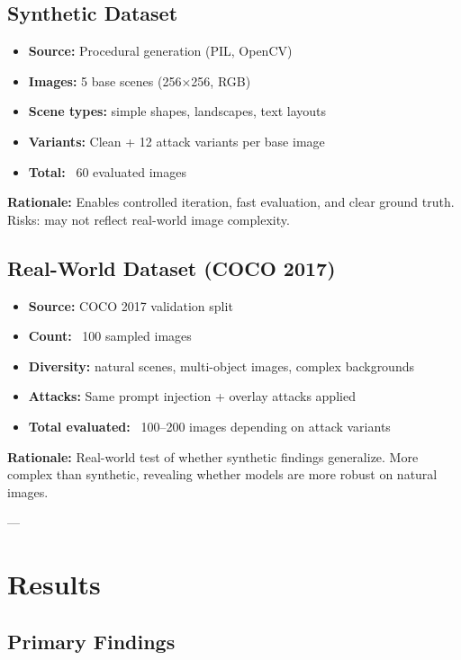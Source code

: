 \documentclass[11pt]{article}
\begin{document}
\subsection{Synthetic Dataset}

\begin{itemize}[leftmargin=2em]
    \item \textbf{Source:} Procedural generation (PIL, OpenCV)
    \item \textbf{Images:} 5 base scenes (256×256, RGB)
    \item \textbf{Scene types:} simple shapes, landscapes, text layouts
    \item \textbf{Variants:} Clean + 12 attack variants per base image
    \item \textbf{Total:} ~60 evaluated images
\end{itemize}

\textbf{Rationale:} Enables controlled iteration, fast evaluation, and clear ground truth. Risks: may not reflect real-world image complexity.

\subsection{Real-World Dataset (COCO 2017)}

\begin{itemize}[leftmargin=2em]
    \item \textbf{Source:} COCO 2017 validation split
    \item \textbf{Count:} ~100 sampled images
    \item \textbf{Diversity:} natural scenes, multi-object images, complex backgrounds
    \item \textbf{Attacks:} Same prompt injection + overlay attacks applied
    \item \textbf{Total evaluated:} ~100--200 images depending on attack variants
\end{itemize}

\textbf{Rationale:} Real-world test of whether synthetic findings generalize. More complex than synthetic, revealing whether models are more robust on natural images.

---

\section{Results}

\subsection{Primary Findings}
\end{document}
